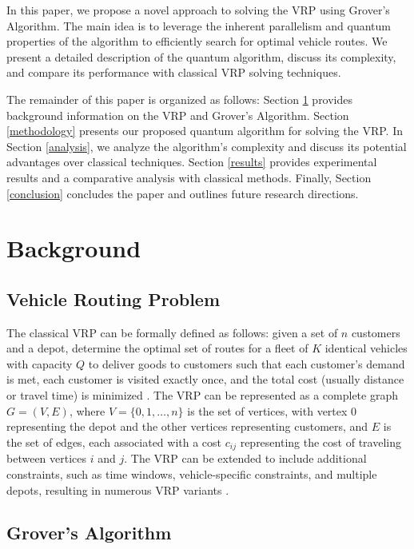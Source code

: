 In this paper, we propose a novel approach to solving the VRP using Grover's Algorithm. The main idea is to leverage the inherent parallelism and quantum properties of the algorithm to efficiently search for optimal vehicle routes. We present a detailed description of the quantum algorithm, discuss its complexity, and compare its performance with classical VRP solving techniques.

The remainder of this paper is organized as follows: Section \ref{background} provides background information on the VRP and Grover's Algorithm. Section \ref{methodology} presents our proposed quantum algorithm for solving the VRP. In Section \ref{analysis}, we analyze the algorithm's complexity and discuss its potential advantages over classical techniques. Section \ref{results} provides experimental results and a comparative analysis with classical methods. Finally, Section \ref{conclusion} concludes the paper and outlines future research directions.

\section{Background}
\label{background}

\subsection{Vehicle Routing Problem}

The classical VRP can be formally defined as follows: given a set of $n$ customers and a depot, determine the optimal set of routes for a fleet of $K$ identical vehicles with capacity $Q$ to deliver goods to customers such that each customer's demand is met, each customer is visited exactly once, and the total cost (usually distance or travel time) is minimized \cite{toth2002vehicle}. The VRP can be represented as a complete graph $G=(V, E)$, where $V=\{0, 1, \ldots, n\}$ is the set of vertices, with vertex $0$ representing the depot and the other vertices representing customers, and $E$ is the set of edges, each associated with a cost $c_{ij}$ representing the cost of traveling between vertices $i$ and $j$. The VRP can be extended to include additional constraints, such as time windows, vehicle-specific constraints, and multiple depots, resulting in numerous VRP variants \cite{golden2008vehicle}.

\subsection{Grover's Algorithm}


